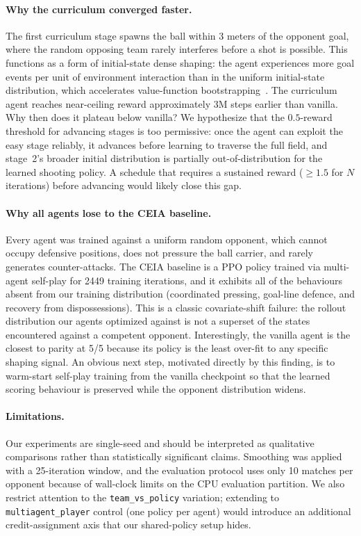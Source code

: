 \documentclass{article}
\begin{document}
\paragraph{Why the curriculum converged faster.}
The first curriculum stage spawns the ball within 3 meters of the opponent goal, where the random opposing team rarely interferes before a shot is possible. This functions as a form of initial-state dense shaping: the agent experiences more goal events per unit of environment interaction than in the uniform initial-state distribution, which accelerates value-function bootstrapping~\citep{florensa2017reverse}.
The curriculum agent reaches near-ceiling reward approximately 3M steps earlier than vanilla. Why then does it plateau below vanilla? We hypothesize that the $0.5$-reward threshold for advancing stages is too permissive: once the agent can exploit the easy stage reliably, it advances before learning to traverse the full field, and stage~2's broader initial distribution is partially out-of-distribution for the learned shooting policy. A schedule that requires a sustained reward ($\geq 1.5$ for $N$ iterations) before advancing would likely close this gap.

\paragraph{Why all agents lose to the CEIA baseline.}
Every agent was trained against a uniform random opponent, which cannot occupy defensive positions, does not pressure the ball carrier, and rarely generates counter-attacks. The CEIA baseline is a PPO policy trained via multi-agent self-play for 2449 training iterations, and it exhibits all of the behaviours absent from our training distribution (coordinated pressing, goal-line defence, and recovery from dispossessions). This is a classic covariate-shift failure: the rollout distribution our agents optimized against is not a superset of the states encountered against a competent opponent. Interestingly, the vanilla agent is the closest to parity at 5/5 because its policy is the least over-fit to any specific shaping signal. An obvious next step, motivated directly by this finding, is to warm-start self-play training from the vanilla checkpoint so that the learned scoring behaviour is preserved while the opponent distribution widens.

\paragraph{Limitations.}
Our experiments are single-seed and should be interpreted as qualitative comparisons rather than statistically significant claims.
Smoothing was applied with a 25-iteration window, and the evaluation protocol uses only 10 matches per opponent because of wall-clock limits on the CPU evaluation partition.
We also restrict attention to the \texttt{team\_vs\_policy} variation; extending to \texttt{multiagent\_player} control (one policy per agent) would introduce an additional credit-assignment axis that our shared-policy setup hides.
\end{document}
